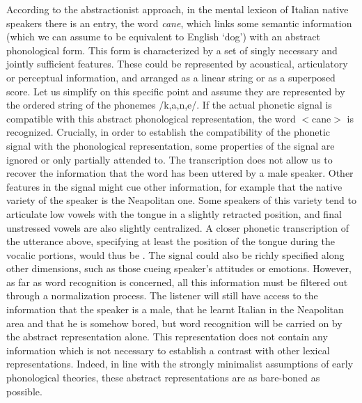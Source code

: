 According to the abstractionist approach, in the mental lexicon of Italian native speakers there is an entry, the word \textit{cane}, which links some semantic information (which we can assume to be equivalent to English `dog') with an abstract phonological form. This form is characterized by a set of singly necessary and jointly sufficient features. These could be represented by acoustical, articulatory or perceptual information, and arranged as a linear string or as a superposed score. Let us simplify on this specific point and assume they are represented by the ordered string of the phonemes /k,a,n,e/. If the actual phonetic signal is compatible with this abstract phonological representation, the word $<$cane$>$ is recognized. Crucially, in order to establish the compatibility of the phonetic signal with the phonological representation, some properties of the signal are ignored or only partially attended to. The transcription  does not allow us to recover the information that the word has been uttered by a male speaker. Other features in the signal might cue other information, for example that the native variety of the speaker is the Neapolitan one. Some speakers of this variety tend to articulate low vowels with the tongue in a slightly retracted position, and final unstressed vowels are also slightly centralized. A closer phonetic transcription of the utterance above, specifying at least the position of the tongue during the vocalic portions, would thus be \textipa{[\textvbaraccent{}k\=*a:n\|x{e}]}. The signal could also be richly specified along other dimensions, such as those cueing speaker's attitudes or emotions. However, as far as word recognition is concerned, all this information must be filtered out through a normalization process. The listener will still have access to the information that the speaker is a male, that he learnt Italian in the Neapolitan area and that he is somehow bored, but word recognition will be carried on by the abstract representation  alone. This representation does not contain any information which is not necessary to establish a contrast with other lexical representations. Indeed, in line with the strongly minimalist assumptions of early phonological theories, these abstract representations are as bare-boned as possible.

